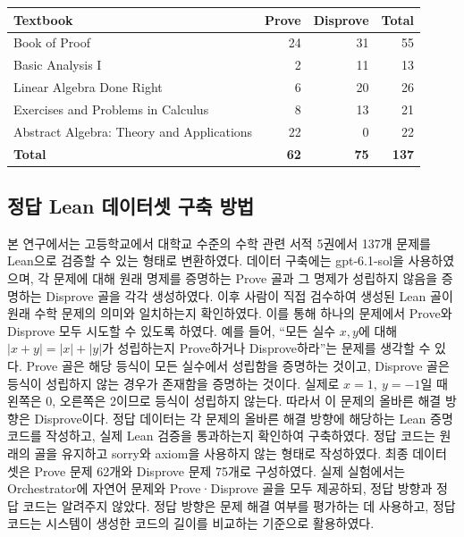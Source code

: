 \documentclass[a4paper,9pt,twocolumn]{extarticle}
\begin{document}
\begin{center}

\label{tab:book_sources}
\footnotesize
\setlength{\tabcolsep}{3pt}\renewcommand{\arraystretch}{1.15}
\begin{tabularx}{\columnwidth}{>{\raggedright\arraybackslash}Xrrr}
\toprule
Textbook & Prove & Disprove & Total \\
\midrule
Book of Proof \cite{r9} & 24 & 31 & 55 \\
Basic Analysis I \cite{r10} & 2 & 11 & 13 \\
Linear Algebra Done Right \cite{r11} & 6 & 20 & 26 \\
Exercises and Problems in Calculus \cite{r12} & 8 & 13 & 21 \\
Abstract Algebra: Theory and Applications \cite{r13} & 22 & 0 & 22 \\
\midrule
\textbf{Total} & \textbf{62} & \textbf{75} & \textbf{137} \\
\bottomrule
\end{tabularx}
\end{center}

\subsection{정답 Lean 데이터셋 구축 방법}


본 연구에서는 고등학교에서 대학교 수준의 수학 관련 서적 5권에서 137개 문제를 Lean으로 검증할 수 있는 형태로 변환하였다. 데이터 구축에는 gpt-6.1-sol을 사용하였으며, 각 문제에 대해 원래 명제를 증명하는 Prove 골과 그 명제가 성립하지 않음을 증명하는 Disprove 골을 각각 생성하였다. 이후 사람이 직접 검수하여 생성된 Lean 골이 원래 수학 문제의 의미와 일치하는지 확인하였다. 이를 통해 하나의 문제에서 Prove와 Disprove 모두 시도할 수 있도록 하였다. 예를 들어, “모든 실수 \(x,y\)에 대해 \(|x+y|=|x|+|y|\)가 성립하는지 Prove하거나 Disprove하라”는 문제를 생각할 수 있다. Prove 골은 해당 등식이 모든 실수에서 성립함을 증명하는 것이고, Disprove 골은 등식이 성립하지 않는 경우가 존재함을 증명하는 것이다. 실제로 \(x=1,\ y=-1\)일 때 왼쪽은 0, 오른쪽은 2이므로 등식이 성립하지 않는다. 따라서 이 문제의 올바른 해결 방향은 Disprove이다. 정답 데이터는 각 문제의 올바른 해결 방향에 해당하는 Lean 증명 코드를 작성하고, 실제 Lean 검증을 통과하는지 확인하여 구축하였다. 정답 코드는 원래의 골을 유지하고 sorry와 axiom을 사용하지 않는 형태로 작성하였다. 최종 데이터셋은 Prove 문제 62개와 Disprove 문제 75개로 구성하였다. 실제 실험에서는 Orchestrator에 자연어 문제와 Prove·Disprove 골을 모두 제공하되, 정답 방향과 정답 코드는 알려주지 않았다. 정답 방향은 문제 해결 여부를 평가하는 데 사용하고, 정답 코드는 시스템이 생성한 코드의 길이를 비교하는 기준으로 활용하였다.
\end{document}
